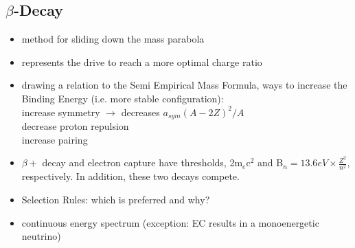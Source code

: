 \documentclass[letter]{article}
\begin{document}
\subsection{$\beta$-Decay}
\begin{itemize}

\item method for sliding down the mass parabola

\item represents the drive to reach a more optimal charge ratio

\item drawing a relation to the Semi Empirical Mass Formula, ways to increase the Binding Energy (i.e. more stable configuration):\\
\hspace{20pt}  increase symmetry $\rightarrow$ decreases $a_{sym}(A-2Z)^{2}/A$\\
\hspace{20pt}  decrease proton repulsion\\
\hspace{20pt}  increase pairing

\item $\beta+$ decay and electron capture have thresholds, 2m$_{e}$c$^{2}$ and B$_{n}=13.6eV\times\frac{Z^{2}}{n^{2}}$, respectively. In addition,  these two decays compete. 

\item Selection Rules: which is preferred and why? 

\item continuous energy spectrum (exception: EC results in a monoenergetic neutrino)

\end{itemize}
\end{document}
